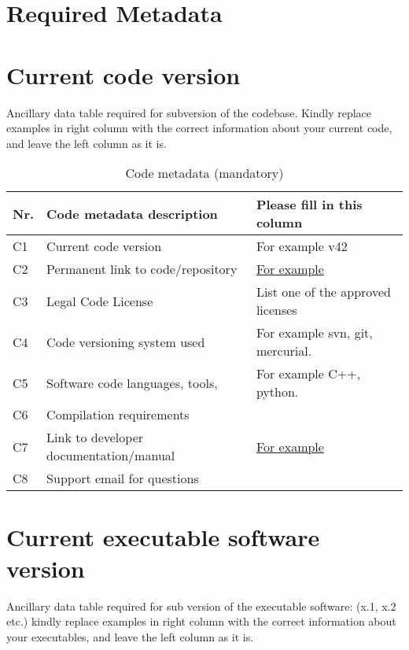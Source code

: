 \section{Required Metadata}
\label{}

\section{Current code version}
\label{}

Ancillary data table required for subversion of the codebase. Kindly replace examples in right column with the correct information about your current code, and leave the left column as it is.

\begin{table}
\begin{tabular}{lll}
\hline
\textbf{Nr.} & \textbf{Code metadata description} & \textbf{Please fill in this column} \\
\hline
C1 & Current code version & For example v42 \\
\hline
C2 & Permanent link to code/repository & \href{https://github.com/mozart/mozart2}{For example} \\
\hline
C3 & Legal Code License   & List one of the approved licenses \\
\hline
C4 & Code versioning system used & For example svn, git, mercurial. \\
\hline
C5 & Software code languages, tools, & For example C++, python. \\
\hline
C6 & Compilation requirements & \\
\hline
C7 & Link to developer documentation/manual & \href{http://mozart.github.io/documentation}{For example} \\
\hline
C8 & Support email for questions & \\
\hline
\end{tabular}
\caption{Code metadata (mandatory)}
\end{table}

\section{Current executable software version}
\label{}

Ancillary data table required for sub version of the executable software: (x.1, x.2 etc.) kindly replace examples in right column with the correct information about your executables, and leave the left column as it is.

